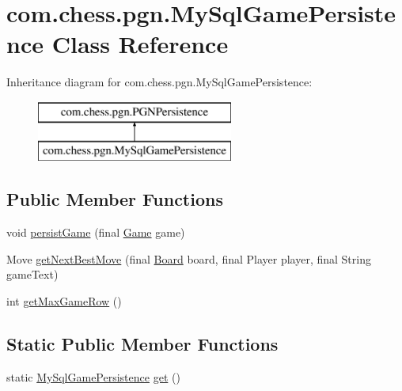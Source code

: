\hypertarget{classcom_1_1chess_1_1pgn_1_1_my_sql_game_persistence}{}\section{com.\+chess.\+pgn.\+My\+Sql\+Game\+Persistence Class Reference}
\label{classcom_1_1chess_1_1pgn_1_1_my_sql_game_persistence}
Inheritance diagram for com.\+chess.\+pgn.\+My\+Sql\+Game\+Persistence\+:\begin{figure}[H]
\begin{center}
\leavevmode
\includegraphics[height=2.000000cm]{classcom_1_1chess_1_1pgn_1_1_my_sql_game_persistence}
\end{center}
\end{figure}
\subsection*{Public Member Functions}
\begin{DoxyCompactItemize}
\item 
void \mbox{\hyperlink{classcom_1_1chess_1_1pgn_1_1_my_sql_game_persistence_a7faec01db9c72e7ef04b63a982013c21}{persist\+Game}} (final \mbox{\hyperlink{classcom_1_1chess_1_1pgn_1_1_game}{Game}} game)
\item 
Move \mbox{\hyperlink{classcom_1_1chess_1_1pgn_1_1_my_sql_game_persistence_a05fad44f338992121a0ec6c474fddf93}{get\+Next\+Best\+Move}} (final \mbox{\hyperlink{classcom_1_1chess_1_1engine_1_1classic_1_1board_1_1_board}{Board}} board, final Player player, final String game\+Text)
\item 
int \mbox{\hyperlink{classcom_1_1chess_1_1pgn_1_1_my_sql_game_persistence_a896b118a83ff72a7650eaad651ec804e}{get\+Max\+Game\+Row}} ()
\end{DoxyCompactItemize}
\subsection*{Static Public Member Functions}
\begin{DoxyCompactItemize}
\item 
static \mbox{\hyperlink{classcom_1_1chess_1_1pgn_1_1_my_sql_game_persistence}{My\+Sql\+Game\+Persistence}} \mbox{\hyperlink{classcom_1_1chess_1_1pgn_1_1_my_sql_game_persistence_a77127a9520a99b8a636bb19d8ffb346b}{get}} ()
\end{DoxyCompactItemize}
